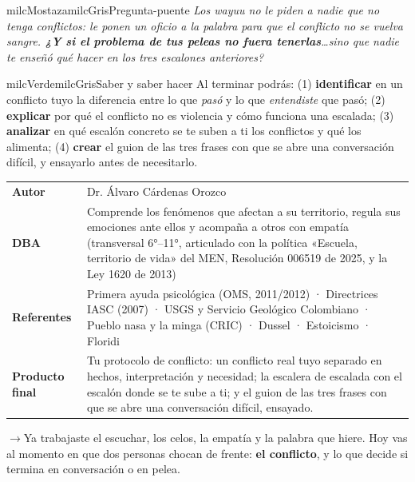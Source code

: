 \documentclass[11pt,letterpaper]{article}
\newcommand{\puente}[1]{%
  \begin{puentebox}%
    \textcolor{milcGradeDark}{$\rightarrow$}\hspace{2mm}#1%
  \end{puentebox}%
}
\begin{document}
\begin{softbox}{milcMostaza}{milcGris}{Pregunta-puente}
\textit{Los wayuu no le piden a nadie que no tenga conflictos: le ponen un oficio a la palabra para que el conflicto no se vuelva sangre. \textbf{¿Y si el problema de tus peleas no fuera tenerlas}\ldots sino que nadie te enseñó qué hacer en los tres escalones anteriores?}
\end{softbox}

\begin{softbox}{milcVerde}{milcGris}{Saber y saber hacer}
Al terminar podrás: (1) \textbf{identificar} en un conflicto tuyo la diferencia entre lo que \emph{pasó} y lo que \emph{entendiste} que pasó; (2) \textbf{explicar} por qué el conflicto no es violencia y cómo funciona una escalada; (3) \textbf{analizar} en qué escalón concreto se te suben a ti los conflictos y qué los alimenta; (4) \textbf{crear} el guion de las tres frases con que se abre una conversación difícil, y ensayarlo antes de necesitarlo.
\end{softbox}



\small
\begin{tabularx}{\textwidth}{>{\bfseries}p{3.0cm}Y}
Autor & Dr. Álvaro Cárdenas Orozco\\
DBA & Comprende los fenómenos que afectan a su territorio, regula sus emociones ante ellos y acompaña a otros con empatía (transversal 6°--11°, articulado con la política «Escuela, territorio de vida» del MEN, Resolución 006519 de 2025, y la Ley 1620 de 2013)\\
Referentes & Primera ayuda psicológica (OMS, 2011/2012) · Directrices IASC (2007) · USGS y Servicio Geológico Colombiano · Pueblo nasa y la minga (CRIC) · Dussel · Estoicismo · Floridi\\
Producto final & Tu protocolo de conflicto: un conflicto real tuyo separado en hechos, interpretación y necesidad; la escalera de escalada con el escalón donde se te sube a ti; y el guion de las tres frases con que se abre una conversación difícil, ensayado.\\
\end{tabularx}
\normalsize

\puente{Ya trabajaste el escuchar, los celos, la empatía y la palabra que hiere. Hoy vas al momento en que dos personas chocan de frente: \textbf{el conflicto}, y lo que decide si termina en conversación o en pelea.}
\end{document}
